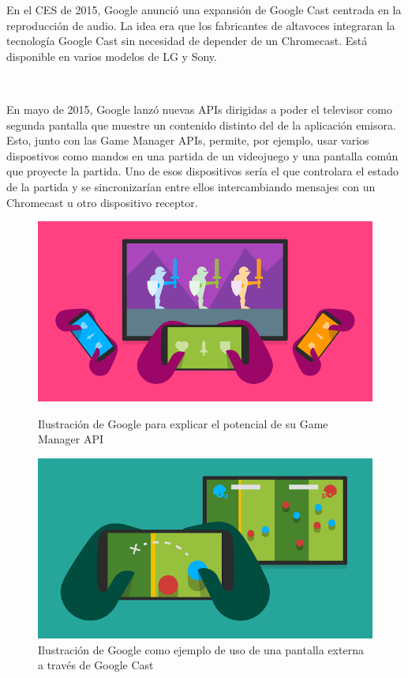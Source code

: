 En el CES de 2015, Google anunció una expansión de Google Cast centrada en la reproducción de audio.
La idea era que los fabricantes de altavoces integraran la tecnología Google Cast sin necesidad de depender de un Chromecast.
Está disponible en varios modelos de LG y Sony.

\

En mayo de 2015, Google lanzó nuevas APIs dirigidas a poder el televisor como segunda pantalla que muestre un contenido distinto del de la aplicación emisora.
Esto, junto con las Game Manager APIs, permite, por ejemplo, usar varios dispostivos como mandos en una partida de un videojuego y una pantalla común que proyecte la partida.
Uno de esos dispositivos sería el que controlara el estado de la partida y se sincronizarían entre ellos intercambiando mensajes con un Chromecast u otro dispositivo receptor.

\begin{figure}[h]
	\centering
	\begin{minipage}[b]{.35\textwidth}
		\includegraphics[scale=0.3]{./Imagenes/games.png}
		\caption{Ilustración de Google para explicar el potencial de su Game Manager API}\label{fig:games}
	\end{minipage}\qquad
	\hspace{1cm}
	\begin{minipage}[b]{.35\textwidth}
		\includegraphics[scale=0.3]{./Imagenes/seconddisplay.png}
		\caption{Ilustración de Google como ejemplo de uso de una pantalla externa a través de Google Cast}\label{fig:seconddisplay}
	\end{minipage}
\end{figure}

